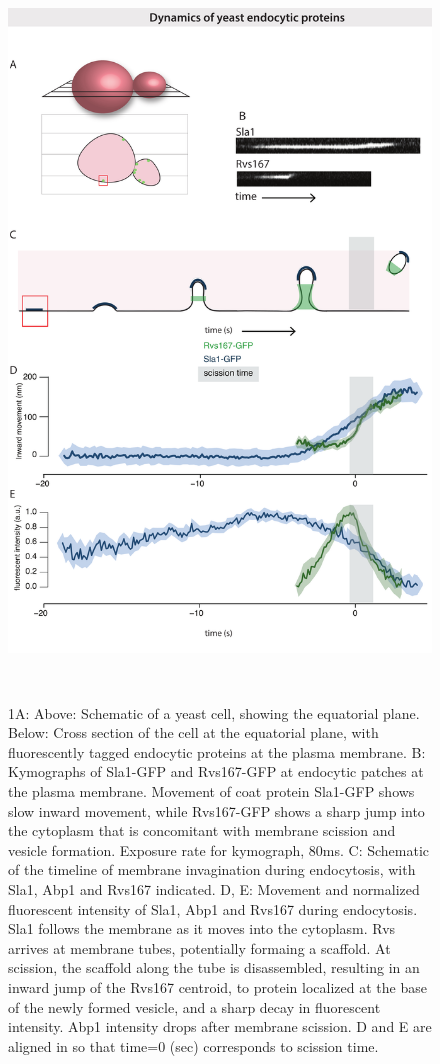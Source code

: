 	\begin{figure}
	\centering
	\includegraphics[width=19.5cm,height=19.5cm,keepaspectratio, valign=t]{figures/results_final/yeast_schemat_fig1_C}
	\caption[Centroid tracking yeast endocytic proteins]
	{1A: Above: Schematic of a yeast cell, showing the equatorial plane. Below: Cross section of the cell at the equatorial plane, with fluorescently tagged endocytic proteins at the plasma membrane. 
	B: Kymographs of Sla1-GFP and Rvs167-GFP at endocytic patches at the plasma membrane. Movement of coat protein Sla1-GFP shows slow inward movement, while Rvs167-GFP shows a sharp jump into the cytoplasm that is concomitant with membrane scission and vesicle formation. Exposure rate for kymograph, 80ms.
	C: Schematic of the timeline of membrane invagination during endocytosis, with Sla1, Abp1 and Rvs167 indicated. 
	D, E: Movement and normalized fluorescent intensity of Sla1, Abp1 and Rvs167 during endocytosis. Sla1 follows the membrane as it moves  into the cytoplasm. Rvs arrives at membrane tubes, potentially formaing a scaffold. At scission, the scaffold along the tube is disassembled, resulting in an inward jump of the Rvs167 centroid, to protein localized at the base of the newly formed vesicle, and a sharp decay in fluorescent intensity. Abp1 intensity drops after membrane scission. D and E are aligned in so that time=0 (sec) corresponds to scission time.
	\label{fig1_schematic}}
	\end{figure}

